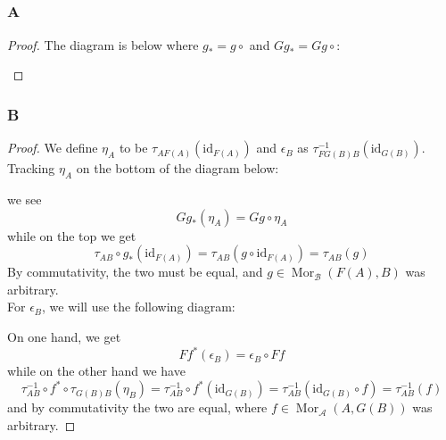 \documentclass{article}
\newcommand{\id}{\mathrm{id}}
\newcommand{\fA}{\mathscr{A}}
\newcommand{\fB}{\mathscr{B}}
\DeclareMathOperator{\Mor}{\mathrm{Mor}}
\begin{document}
\subsection{}
\subsubsection{A}\label{1.5.A}
\begin{proof}
The diagram is below where $g_*=g\circ$ and $Gg_*=Gg\circ $:
    \begin{center}
    \end{center}
    
\end{proof}
\subsubsection{B}\label{1.5.B}
\begin{proof}
    We define $\eta_A$ to be $\tau_{AF(A)}(\id_{F(A)})$ and $\epsilon_B$ as $\tau_{FG(B)B}^{-1}(\id_{G(B)})$. Tracking $\eta_A$ on the bottom of the diagram below: 
    \begin{center}
    \end{center}
    we see
    \[
    Gg_*(\eta_A)=Gg\circ \eta_A
    \]
    while on the top we get
    \[
    \tau_{AB}\circ g_*(\id_{F(A)})=\tau_{AB}(g\circ \id_{F(A)})=\tau_{AB}(g)
    \]
    By commutativity, the two must be equal, and $g\in \Mor_\fB(F(A),B)$ was arbitrary.\\
    \newline
    For $\epsilon_B$, we will use the following diagram:
    \begin{center}
    \end{center}
    On one hand, we get
    \[
    Ff^*(\epsilon_B)=\epsilon_B\circ Ff
    \]
    while on the other hand we have
    \[
    \tau_{AB}^{-1}\circ f^*\circ \tau_{G(B)B}(\eta_B)=\tau_{AB}^{-1}\circ f^*(\id_{G(B)})=\tau_{AB}^{-1}(\id_{G(B)}\circ f)=\tau_{AB}^{-1}(f)
    \]
    and by commutativity the two are equal, where $f\in \Mor_\fA(A,G(B))$ was arbitrary.
\end{proof}
\end{document}
